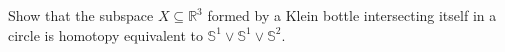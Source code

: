 \setcounter{question}{19}
\question Show that the subspace $X \subseteq \mathbb{R}^3$ formed by a Klein 
bottle intersecting itself in a circle is homotopy equivalent to $\mathbb{S}^1 
\vee \mathbb{S}^1 \vee \mathbb{S}^2$.

\begin{solution}
%

%
\end{solution}